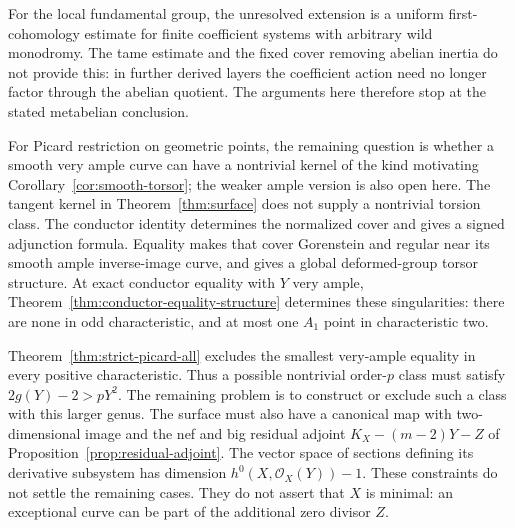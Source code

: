 \documentclass[11pt]{article}
\theoremstyle{remark}\newtheorem{remark}[theorem]{Remark}
\newcommand{\OO}{\mathcal O}
\begin{document}
For the local fundamental group, the unresolved extension is a uniform first-cohomology estimate for finite coefficient systems with arbitrary wild monodromy. The tame estimate and the fixed cover removing abelian inertia do not provide this: in further derived layers the coefficient action need no longer factor through the abelian quotient. The arguments here therefore stop at the stated metabelian conclusion.

For Picard restriction on geometric points, the remaining question is whether a smooth very ample curve can have a nontrivial kernel of the kind motivating Corollary~\ref{cor:smooth-torsor}; the weaker ample version is also open here. The tangent kernel in Theorem~\ref{thm:surface} does not supply a nontrivial torsion class. The conductor identity determines the normalized cover and gives a signed adjunction formula. Equality makes that cover Gorenstein and regular near its smooth ample inverse-image curve, and gives a global deformed-group torsor structure. At exact conductor equality with $Y$ very ample,
Theorem~\ref{thm:conductor-equality-structure} determines these
singularities: there are none in odd characteristic, and at most
one $A_1$ point in characteristic two.

Theorem~\ref{thm:strict-picard-all} excludes the smallest very-ample equality in every positive characteristic. Thus a possible nontrivial order-$p$ class must satisfy $2g(Y)-2>pY^2$. The remaining problem is to construct or exclude such a class with
this larger genus. The surface must also have a canonical map
with two-dimensional image and the nef and big residual adjoint
$K_X-(m-2)Y-Z$ of Proposition~\ref{prop:residual-adjoint}.
The vector space of sections defining its derivative subsystem has
dimension $h^0(X,\OO_X(Y))-1$.
These constraints do not settle the remaining cases.
They do not assert that $X$ is minimal: an exceptional curve can be
part of the additional zero divisor $Z$.
\end{document}
